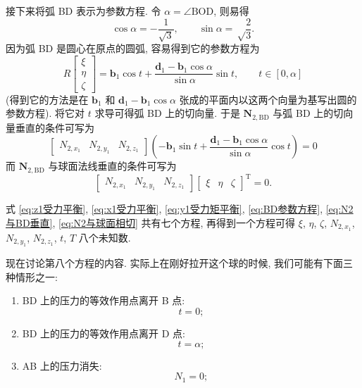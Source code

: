 \documentclass{article}
\begin{document}
接下来将弧 BD 表示为参数方程.
令 $\alpha=\angle\mathrm{BOD}$, 则易得
\begin{equation}
	\cos\alpha=-\frac1{\sqrt3},\qquad\sin\alpha=\sqrt\frac23.
\end{equation}
因为弧 BD 是圆心在原点的圆弧, 容易得到它的参数方程为
\begin{equation}
	R\left[\begin{matrix}\xi \\ \eta \\ \zeta\end{matrix}\right]
	=\mathbf b_1\cos t+\frac{\mathbf d_1-\mathbf b_1\cos\alpha}{\sin\alpha}\sin t,
	\qquad t\in\left[0,\alpha\right]
	\label{eq:BD参数方程}
\end{equation}
(得到它的方法是在 $\mathbf b_1$ 和 $\mathbf d_1-\mathbf b_1\cos\alpha$
张成的平面内以这两个向量为基写出圆的参数方程).
将它对 $t$ 求导可得弧 BD 上的切向量.
于是 $\mathbf N_{2,\mathrm{BD}}$ 与弧 BD 上的切向量垂直的条件可写为
\begin{equation}
	\left[\begin{matrix}N_{2,x_1} & N_{2,y_1} & N_{2,z_1}\end{matrix}\right]
	\left(-\mathbf b_1\sin t+\frac{\mathbf d_1-\mathbf b_1\cos\alpha}{\sin\alpha}\cos t\right)=0
	\label{eq:N2与BD垂直}
\end{equation}
而 $\mathbf N_{2,\mathrm{BD}}$ 与球面法线垂直的条件可写为
\begin{equation}
	\left[\begin{matrix}N_{2,x_1} & N_{2,y_1} & N_{2,z_1}\end{matrix}\right]
	\left[\begin{matrix}\xi & \eta & \zeta\end{matrix}\right]^\mathrm T=0.
	\label{eq:N2与球面相切}
\end{equation}

式 \ref{eq:z1受力平衡}, \ref{eq:x1受力平衡}, \ref{eq:y1受力矩平衡}, \ref{eq:BD参数方程}, \ref{eq:N2与BD垂直}, \ref{eq:N2与球面相切}
共有七个方程, 再得到一个方程可得
$\xi$, $\eta$, $\zeta$, $N_{2,x_1}$, $N_{2,y_1}$, $N_{2,z_1}$, $t$, $T$ 八个未知数.

现在讨论第八个方程的内容.
实际上在刚好拉开这个球的时候, 我们可能有下面三种情形之一:
\begin{enumerate}
	\item BD 上的压力的等效作用点离开 B 点:
	\begin{equation}
		t=0;
		\label{eq:情形1}
	\end{equation}
	\item BD 上的压力的等效作用点离开 D 点:
	\begin{equation}
		t=\alpha;
		\label{eq:情形2}
	\end{equation}
	\item AB 上的压力消失:
	\begin{equation}
		N_1=0;
		\label{eq:情形3}
	\end{equation}
\end{enumerate}
\end{document}
